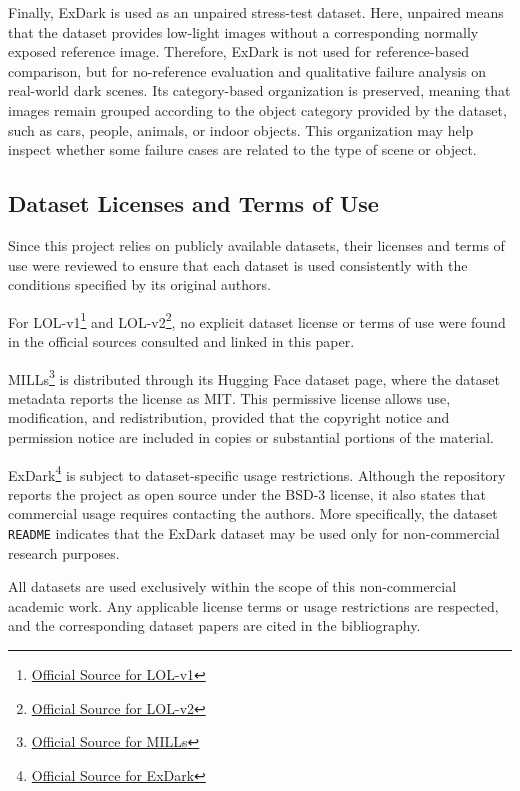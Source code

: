 Finally, ExDark is used as an unpaired stress-test dataset. Here, unpaired means that the dataset provides low-light images without a corresponding normally exposed reference image. Therefore, ExDark is not used for reference-based comparison, but for no-reference evaluation and qualitative failure analysis on real-world dark scenes. Its category-based organization is preserved, meaning that images remain grouped according to the object category provided by the dataset, such as cars, people, animals, or indoor objects. This organization may help inspect whether some failure cases are related to the type of scene or object.

\subsection{Dataset Licenses and Terms of Use}

Since this project relies on publicly available datasets, their licenses and terms of use were reviewed to ensure that each dataset is used consistently with the conditions specified by its original authors.

For LOL-v1\footnote{\href{https://daooshee.github.io/BMVC2018website/}{Official Source for LOL-v1}} and LOL-v2\footnote{\href{https://github.com/flyywh/CVPR-2020-Semi-Low-Light}{Official Source for LOL-v2}}, no explicit dataset license or terms of use were found in the official sources consulted and linked in this paper.

MILLs\footnote{\href{https://huggingface.co/datasets/davidserra9/MILL}{Official Source for MILLs}} is distributed through its Hugging Face dataset page, where the dataset metadata reports the license as MIT. This permissive license allows use, modification, and redistribution, provided that the copyright notice and permission notice are included in copies or substantial portions of the material.

ExDark\footnote{\href{https://github.com/cs-chan/Exclusively-Dark-Image-Dataset}{Official Source for ExDark}} is subject to dataset-specific usage restrictions. Although the repository reports the project as open source under the BSD-3 license, it also states that commercial usage requires contacting the authors. More specifically, the dataset \texttt{README} indicates that the ExDark dataset may be used only for non-commercial research purposes.

All datasets are used exclusively within the scope of this non-commercial academic work. Any applicable license terms or usage restrictions are respected, and the corresponding dataset papers are cited in the bibliography.

